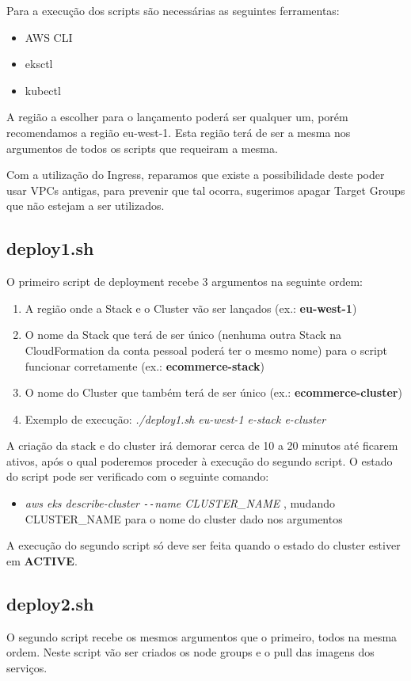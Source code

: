 \documentclass[11pt,a4paper]{article}
\begin{document}
Para a execução dos scripts são necessárias as seguintes ferramentas:
\begin{itemize}
	\item AWS CLI
	\item eksctl
	\item kubectl
\end{itemize}

A região a escolher para o lançamento poderá ser qualquer um, porém recomendamos a região eu-west-1. Esta região terá de ser a mesma nos argumentos de todos os scripts que requeiram a mesma.

Com a utilização do Ingress, reparamos que existe a possibilidade deste poder usar VPCs antigas, para prevenir que tal ocorra, sugerimos apagar Target Groups que não estejam a ser utilizados.

\subsection{deploy1.sh}
O primeiro script de deployment recebe 3 argumentos na seguinte ordem:
\begin{enumerate}
	\item A região onde a Stack e o Cluster vão ser lançados (ex.: \textbf{eu-west-1})
	\item O nome da Stack que terá de ser único (nenhuma outra Stack na CloudFormation da conta pessoal poderá ter o mesmo nome) para o script funcionar corretamente (ex.: \textbf{ecommerce-stack})
	\item O nome do Cluster que também terá de ser único (ex.: \textbf{ecommerce-cluster})
	\item Exemplo de execução: \textit{./deploy1.sh eu-west-1 e-stack e-cluster}
\end{enumerate}

A criação da stack e do cluster irá demorar cerca de 10 a 20 minutos até ficarem ativos, após o qual poderemos proceder à execução do segundo script. O estado do script pode ser verificado com o seguinte comando:
\begin{itemize}
	\item \textit{aws eks describe-cluster \texttt{-{}-}name CLUSTER\_NAME} , mudando CLUSTER\_NAME para o nome do cluster dado nos argumentos
\end{itemize}
A execução do segundo script só deve ser feita quando o estado do cluster estiver em \textbf{ACTIVE}.

\subsection{deploy2.sh}
O segundo script recebe os mesmos argumentos que o primeiro, todos na mesma ordem. Neste script vão ser criados os node groups e o pull das imagens dos serviços.
\end{document}
